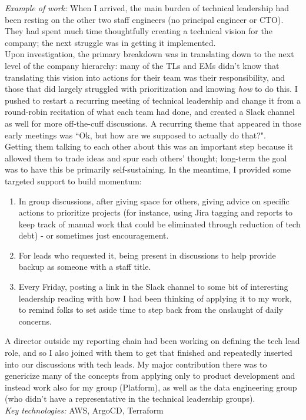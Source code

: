 \documentclass[margin,line]{resume}
\begin{document}
\begin{resume}
    \vspace{-2mm}
    \textit{Example of work:}  When I arrived, the main burden of technical
    leadership had been resting on the other two staff engineers (no principal
    engineer or CTO).  They had spent much time thoughtfully creating a
    technical vision for the company; the next struggle was in getting it
    implemented.\\
    Upon investigation, the primary breakdown was in translating down to the
    next level of the company hierarchy:  many of the TLs and EMs didn't know
    that translating this vision into actions for their team was their
    responsibility, and those that did largely struggled with prioritization
    and knowing \textit{how} to do this.  I pushed to restart a recurring
    meeting of technical leadership and change it from a round-robin recitation
    of what each team had done, and created a Slack channel as well for more
    off-the-cuff discussions. A recurring theme that appeared in those early
    meetings was ``Ok, but how are we supposed to actually do that?".\\
    Getting them talking to each other about this was an important step because
    it allowed them to trade ideas and spur each others' thought; long-term the
    goal was to have this be primarily self-sustaining.  In the meantime, I
    provided some targeted support to build momentum:
    \begin{enumerate}
        \item In group discussions, after giving space for others, giving
            advice on specific actions to prioritize projects (for instance,
            using Jira tagging and reports to keep track of manual work that
            could be eliminated through reduction of tech debt) - or sometimes
            just encouragement.
        \item For leads who requested it, being present in discussions to help
            provide backup as someone with a staff title.
        \item Every Friday, posting a link in the Slack channel to some bit of
            interesting leadership reading with how I had been thinking of
            applying it to my work, to remind folks to set aside time to step
            back from the onslaught of daily concerns.
    \end{enumerate}
    \vspace{-4mm}
    A director outside my reporting chain had been working on defining the tech
    lead role, and so I also joined with them to get that finished and
    repeatedly inserted into our discussions with tech leads.  My major
    contribution there was to genericize many of the concepts from applying
    only to product development and instead work also for my group (Platform),
    as well as the data engineering group (who didn't have a representative in
    the technical leadership groups).\\
    \textit{Key technologies:} AWS, ArgoCD, Terraform


\end{resume}
\end{document}
